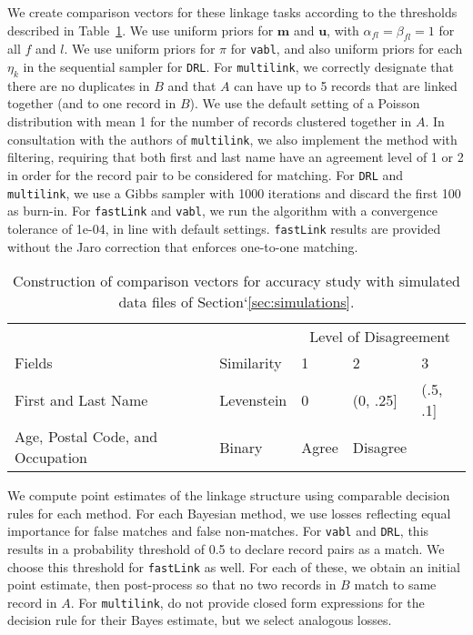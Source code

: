 \documentclass[12pt,letterpaper]{article}
\newcommand{\1}[1]{\mathbb{I}\!\left[#1\right]} %
\begin{document}
We create comparison vectors for these linkage tasks according to the thresholds described in Table~\ref{Tab:sadinle_simulation_cutoffs}. We use uniform priors for $\bm{m}$ and $\bm{u}$, with $\alpha_{fl} = \beta_{fl} = 1$ for all $f$ and $l$. We use uniform priors for $\pi$ for \texttt{vabl}, and also uniform priors for each $\eta_k$ in the sequential sampler for \texttt{DRL}. For \texttt{multilink}, we correctly designate that there are no duplicates in $B$ and that $A$ can have up to 5 records that are linked together (and to one record in $B$). We use the default setting of a Poisson distribution with mean 1 for the number of records clustered together in $A$. In consultation with the authors of \texttt{multilink}, we also implement the method with filtering, requiring that both first and last name have an agreement level of 1 or 2 in order for the record pair to be considered for matching. For \texttt{DRL} and \texttt{multilink}, we use a Gibbs sampler with 1000 iterations and discard the first 100 as burn-in. For \texttt{fastLink} and \texttt{vabl}, we run the algorithm with a convergence tolerance of 1e-04, in line with default settings. \texttt{fastLink} results are provided without the Jaro correction that enforces one-to-one matching. 

\begin{table}
	\centering
	\begin{tabular}{lllll}
		\multicolumn{2}{c}{ } & \multicolumn{3}{c}{Level of Disagreement} \\
		\cline{3-5}
		Fields & Similarity & 1 & 2 & 3 \\
		\hline
		First and Last Name & Levenstein & 0 & (0, .25] &  (.5, .1]\\
		Age, Postal Code, and Occupation & Binary & Agree & Disagree &  \\
		\hline
	\end{tabular}
	\caption{Construction of comparison vectors for accuracy study with simulated data files of Section`\ref{sec:simulations}.}
	\label{Tab:sadinle_simulation_cutoffs}
\end{table}

We compute point estimates of the linkage structure using comparable decision rules for each method. For each Bayesian method, we use losses reflecting equal importance for false matches and false non-matches. For \texttt{vabl} and \texttt{DRL}, this results in a probability threshold of 0.5 to declare record pairs as a match. We choose this threshold for \texttt{fastLink} as well. For each of these, we obtain an initial point estimate, then post-process so that no two records in $B$ match to same record in $A$. For \texttt{multilink}, \cite{aleshin2023multifile} do not provide closed form expressions for the decision rule for their Bayes estimate, but we select analogous losses. 
\end{document}
